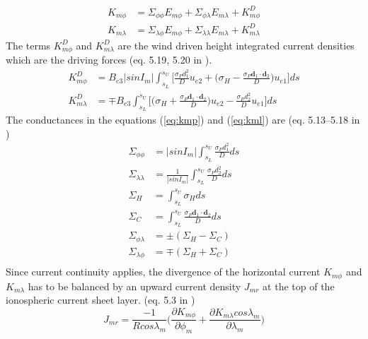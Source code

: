% 
\begin{align}
K_{m \phi} &= \Sigma_{\phi \phi} E_{m \phi} + \Sigma_{\phi \lambda} E_{m \lambda}
                 + K_{m \phi}^{D} \label{eq:kmp}\\
K_{m \lambda} &=  \Sigma_{\lambda \phi} E_{m \phi} + \Sigma_{\lambda \lambda} E_{m \lambda}
                 + K_{m \lambda}^{D}\label{eq:kml}
\end{align}
%
The terms $ K_{m \phi}^{D} $ and $K_{m \lambda}^{D}$ are the wind driven 
height integrated current densities which are the driving forces 
(eq. 5.19, 5.20 in \cite{rich95}).
% 
\begin{align}
K_{m \phi}^D &= B_{e3} |sin I_m |  \int_{s_L}^{s_U} \bigl[ 
     \frac{\sigma_P d_1^2}{D} u_{e2} + \bigl( \sigma_H - \frac{\sigma_P
     \mathbf{d}_1 \cdot \mathbf{d}_2 }{D}\bigr) u_{e1} \bigr] ds \label{eq:eldy_1}\\
K_{m \lambda}^D &= \mp B_{e3}   \int_{s_L}^{s_U} \bigl[ 
     \bigl( \sigma_H + \frac{\sigma_P
     \mathbf{d}_1 \cdot \mathbf{d}_2 }{D}\bigr) u_{e2}  -
     \frac{\sigma_P d_2^2}{D} u_{e1}  \bigr] ds \label{eq:eldy_2}
\end{align}
%
The conductances in the equations (\ref{eq:kmp}) and (\ref{eq:kml}) are 
(eq. 5.13--5.18 in \cite{rich95})
% 
\begin{align}
\Sigma_{\phi \phi} &= |sin I_m |  \int_{s_L}^{s_U} 
     \frac{\sigma_P d_1^2}{D}   ds  \label{eq:eldy_3}\\
\Sigma_{\lambda \lambda} &= \frac{1}{|sin I_m |}  \int_{s_L}^{s_U} 
     \frac{\sigma_P d_2^2}{D}  ds  \label{eq:eldy_4}\\
\Sigma_{H} &=  \int_{s_L}^{s_U}\sigma_H   ds  \label{eq:eldy_5}\\
\Sigma_{C} &=  \int_{s_L}^{s_U} \frac{\sigma_P 
   \mathbf{d}_1 \cdot \mathbf{d}_2 }{D}  ds  \label{eq:eldy_6}\\
\Sigma_{\phi \lambda} &= \pm ( \Sigma_H - \Sigma_C) \label{eq:eldy_7}\\
\Sigma_{ \lambda \phi} &= \mp ( \Sigma_H + \Sigma_C) \label{eq:eldy_8}\\
\end{align}
%
Since current continuity applies, the divergence of the horizontal current 
$K_{m \phi}$ and $K_{m \lambda}$ has
to be balanced by an upward current density $J_{mr}$ at the top of the ionospheric current
sheet layer. (eq. 5.3 in \cite{rich95})
%
\begin{equation}
   {J}_{mr}  = \frac{-1}{R cos \lambda_m} \bigl(
    \frac{\partial K_{m \phi}}{\partial \phi_m} + 
    \frac{\partial K_{m \lambda} cos \lambda_m}{\partial \lambda_m} \bigr)
    \label{eq:j_mr}
\end{equation}
